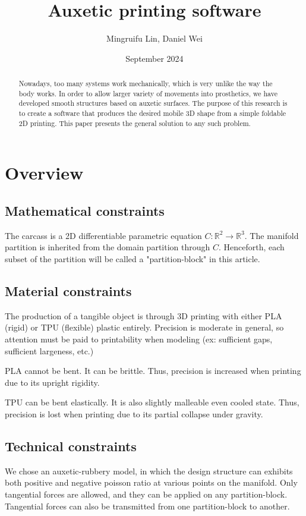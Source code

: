 \documentclass{article}
\title{Auxetic printing software}
\author{Mingruifu Lin, Daniel Wei}
\date{September 2024}
\begin{document}
\maketitle

\begin{abstract}
  Nowadays, too many systems work mechanically, which is very unlike the way the body works. In order to allow larger variety of movements into prosthetics, we have developed smooth structures based on auxetic surfaces. The purpose of this research is to create a software that produces the desired mobile 3D shape from a simple foldable 2D printing. This paper presents the general solution to any such problem.
\end{abstract}

\section{Overview}

\subsection{Mathematical constraints}
The carcass is a 2D differentiable parametric equation $ C: \mathbb{R}^2 \rightarrow \mathbb{R}^3 $. The manifold partition is inherited from the domain partition through $C$. Henceforth, each subset of the partition will be called a "partition-block" in this article.

\subsection{Material constraints}
The production of a tangible object is through 3D printing with either PLA (rigid) or TPU (flexible) plastic entirely. Precision is moderate in general, so attention must be paid to printability when modeling (ex: sufficient gaps, sufficient largeness, etc.)

PLA cannot be bent. It can be brittle. Thus, precision is increased when printing due to its upright rigidity.

TPU can be bent elastically. It is also slightly malleable even cooled state. Thus, precision is lost when printing due to its partial collapse under gravity.

\subsection{Technical constraints}
We chose an auxetic-rubbery model, in which the design structure can exhibits both positive and negative poisson ratio at various points on the manifold. Only tangential forces are allowed, and they can be applied on any partition-block. Tangential forces can also be transmitted from one partition-block to another.
\end{document}
